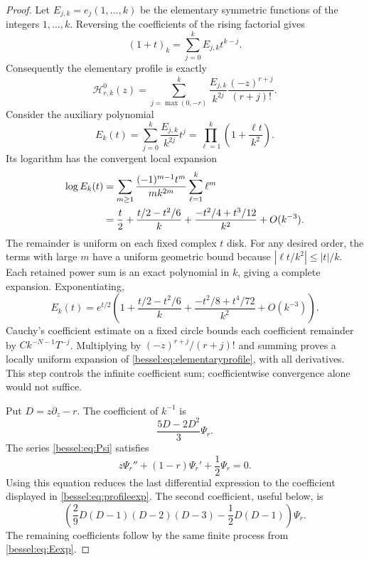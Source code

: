 \begin{proof}
Let $E_{j,k}=e_j(1,\ldots,k)$ be the elementary symmetric functions
of the integers $1,\ldots,k$. Reversing the coefficients of the
rising factorial gives
\[
 (1+t)_k=\sum_{j=0}^kE_{j,k}t^{k-j}.
\]
Consequently the elementary profile is exactly
\begin{equation}\label{bessel:eq:elementaryprofile}
 \mathcal H_{r,k}^{0}(z)
  =\sum_{j=\max(0,-r)}^k\frac{E_{j,k}}{k^{2j}}
       \frac{(-z)^{r+j}}{(r+j)!}.
\end{equation}
Consider the auxiliary polynomial
\[
 E_k(t)=\sum_{j=0}^k\frac{E_{j,k}}{k^{2j}}t^j
       =\prod_{\ell=1}^k\left(1+\frac{\ell t}{k^2}\right).
\]
Its logarithm has the convergent local expansion
\begin{align}\label{bessel:eq:Eexp}
 \log E_k(t)
 &=\sum_{m\geq1}\frac{(-1)^{m-1}t^m}{m k^{2m}}
                \sum_{\ell=1}^k\ell^m\notag\\
 &=\frac t2+\frac{t/2-t^2/6}{k}
       +\frac{-t^2/4+t^3/12}{k^2}+O(k^{-3}).
\end{align}
The remainder is uniform on each fixed complex $t$ disk. For any
desired order, the terms with large $m$ have a uniform geometric
bound because $|\ell t/k^2|\leq |t|/k$. Each retained power sum is
an exact polynomial in $k$, giving a complete expansion. Exponentiating,
\begin{equation}\label{bessel:eq:Efirst}
 E_k(t)=e^{t/2}\left(1+\frac{t/2-t^2/6}{k}
               +\frac{-t^2/8+t^4/72}{k^2}+O(k^{-3})\right).
\end{equation}
Cauchy's coefficient estimate on a fixed circle bounds each
coefficient remainder by $C k^{-N-1}T^{-j}$. Multiplying by
$(-z)^{r+j}/(r+j)!$ and summing proves a locally uniform expansion
of \eqref{bessel:eq:elementaryprofile}, with all derivatives. This
step controls the infinite coefficient sum; coefficientwise convergence
alone would not suffice.

Put $D=z\partial_z-r$. The coefficient of $k^{-1}$ is
\[
 \frac{5D-2D^2}{3}\Psi_r.
\]
The series \eqref{bessel:eq:Psi} satisfies
\begin{equation}\label{bessel:eq:Psiode}
 z\Psi_r''+(1-r)\Psi_r'+\frac12\Psi_r=0.
\end{equation}
Using this equation reduces the last differential expression to the
coefficient displayed in \eqref{bessel:eq:profileexp}. The second
coefficient, useful below, is
\begin{equation}\label{bessel:eq:Hsecond}
 \left(\frac29D(D-1)(D-2)(D-3)-\frac12D(D-1)\right)\Psi_r.
\end{equation}
The remaining coefficients follow by the same finite process from
\eqref{bessel:eq:Eexp}.


\end{proof}
